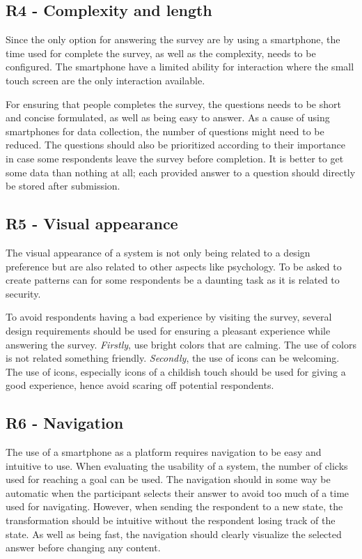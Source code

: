     \subsection*{R4 - Complexity and length}
    Since the only option for answering the survey are by using a smartphone, the time used for complete the survey, as well as the complexity, needs to be configured. The smartphone have a limited ability for interaction where the small touch screen are the only interaction available. 

    For ensuring that people completes the survey, the questions needs to be short and concise formulated, as well as being easy to answer. As a cause of using smartphones for data collection, the number of questions might need to be reduced. The questions should also be prioritized according to their importance in case some respondents leave the survey before completion. It is better to get some data than nothing at all; each provided answer to a question should directly be stored after submission. 

    \subsection*{R5 - Visual appearance}
    The visual appearance of a system is not only being related to a design preference but are also related to other aspects like psychology. To be asked to create patterns can for some respondents be a daunting task as it is related to security. 

    To avoid respondents having a bad experience by visiting the survey, several design requirements should be used for ensuring a pleasant experience while answering the survey. {\it Firstly}, use bright colors that are calming. The use of colors is not related something friendly. {\it Secondly}, the use of icons can be welcoming. The use of icons, especially icons of a childish touch should be used for giving a good experience, hence avoid scaring off potential respondents. 

    \subsection*{R6 - Navigation}
    The use of a smartphone as a platform requires navigation to be easy and intuitive to use. When evaluating the usability of a system, the number of clicks used for reaching a goal can be used. The navigation should in some way be automatic when the participant selects their answer to avoid too much of a time used for navigating. However, when sending the respondent to a new state, the transformation should be intuitive without the respondent losing track of the state. As well as being fast, the navigation should clearly visualize the selected answer before changing any content. 

